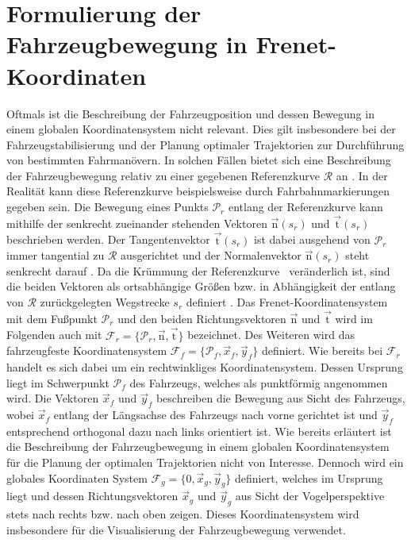 \section{Formulierung der Fahrzeugbewegung in Frenet-Koordinaten}\label{sec:Frenet_KS}
Oftmals ist die Beschreibung der Fahrzeugposition und dessen Bewegung in einem globalen Koordinatensystem nicht relevant. Dies gilt insbesondere bei der Fahrzeugstabilisierung und der Planung optimaler Trajektorien zur Durchführung von bestimmten Fahrmanövern. In solchen Fällen bietet sich eine Beschreibung der Fahrzeugbewegung relativ zu einer gegebenen Referenzkurve $\mathcal{R}$ an \cite{Rathgeber.2016}. In der Realität kann diese Referenzkurve beispielsweise durch Fahrbahnmarkierungen gegeben sein. Die Bewegung eines Punkts $\mathcal{P}_r$ entlang der Referenzkurve kann mithilfe der senkrecht zueinander stehenden Vektoren $\vec{\textrm{n}}(s_r)$ und $\vec{\textrm{t}}(s_r)$ beschrieben werden. Der Tangentenvektor $\vec{\textrm{t}}(s_r)$ ist dabei ausgehend von $\mathcal{P}_r$ immer tangential zu $\mathcal{R}$ ausgerichtet und der Normalenvektor $\vec{\textrm{n}}(s_r)$ steht senkrecht darauf \cite{Rathgeber.2016}. Da die Krümmung der Referenzkurve \kapparefofs~veränderlich ist, sind die beiden Vektoren als ortsabhängige Größen bzw. in Abhängigkeit der entlang von $\mathcal{R}$ zurückgelegten Wegstrecke $s_r$ definiert \cite{Werling.2011}. Das Frenet-Koordinatensystem mit dem Fußpunkt $\mathcal{P}_r$ und den beiden Richtungsvektoren $\vec{\textrm{n}}$ und $\vec{\textrm{t}}$ wird im Folgenden auch mit $\mathcal{F}_r = \{\mathcal{P}_r, \vec{\textrm{n}}, \vec{\textrm{t}}\}$ bezeichnet. Des Weiteren wird das fahrzeugfeste Koordinatensystem $\mathcal{F}_f = \{\mathcal{P}_f, \vec{x}_f, \vec{y}_f\}$ definiert. Wie bereits bei $\mathcal{F}_r$ handelt es sich dabei um ein rechtwinkliges Koordinatensystem. Dessen Ursprung liegt im Schwerpunkt $\mathcal{P}_f$ des Fahrzeugs, welches als punktförmig angenommen wird. Die Vektoren $\vec{x}_f$ und $\vec{y}_f$ beschreiben die Bewegung aus Sicht des Fahrzeugs, wobei $\vec{x}_f$ entlang der Längsachse des Fahrzeugs nach vorne gerichtet ist und $\vec{y}_f$ entsprechend orthogonal dazu nach links orientiert ist. Wie bereits erläutert ist die Beschreibung der Fahrzeugbewegung in einem globalen Koordinatensystem für die Planung der optimalen Trajektorien nicht von Interesse. Dennoch wird ein globales Koordinaten System $\mathcal{F}_g = \{0, \vec{x}_g, \vec{y}_g\}$ definiert, welches im Ursprung liegt und dessen Richtungsvektoren $\vec{x}_g$ und $\vec{y}_g$ aus Sicht der Vogelperspektive stets nach rechts bzw. nach oben zeigen. Dieses Koordinatensystem wird insbesondere für die Visualisierung der Fahrzeugbewegung verwendet.

